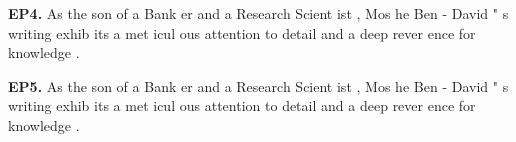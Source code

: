 \begin{mdframed}
\textbf{EP4.} \textcolor{Gray0}{As} \textcolor{Gray0}{the} \textcolor{Gray0}{son} \textcolor{Gray3}{of} \textcolor{Gray1}{a} \textcolor{Gray0}{Bank} \textcolor{Gray0}{er} \textcolor{Gray1}{and} \textcolor{Gray0}{a} \textcolor{Gray0}{Research} \textcolor{Gray1}{Scient} \textcolor{Gray5}{ist} \textcolor{Gray1}{,} \textcolor{Gray0}{Mos} \textcolor{Gray0}{he} \textcolor{Gray0}{Ben} \textcolor{Gray0}{-} \textcolor{Gray1}{David} \textcolor{Gray0}{"} \textcolor{Gray3}{s} \textcolor{Gray0}{writing} \textcolor{Gray0}{exhib} \textcolor{Gray4}{its} \textcolor{Gray1}{a} \textcolor{Gray0}{met} \textcolor{Gray7}{icul} \textcolor{Gray2}{ous} \textcolor{Gray0}{attention} \textcolor{Gray4}{to} \textcolor{Gray4}{detail} \textcolor{Gray0}{and} \textcolor{Gray1}{a} \textcolor{Gray0}{deep} \textcolor{Gray0}{rever} \textcolor{Gray1}{ence} \textcolor{Gray3}{for} \textcolor{Gray2}{knowledge} \textcolor{Gray0}{.} 

\textbf{EP5.} \textcolor{Gray0}{As} \textcolor{Gray0}{the} \textcolor{Gray0}{son} \textcolor{Gray3}{of} \textcolor{Gray1}{a} \textcolor{Gray0}{Bank} \textcolor{Gray0}{er} \textcolor{Gray0}{and} \textcolor{Gray0}{a} \textcolor{Gray0}{Research} \textcolor{Gray0}{Scient} \textcolor{Gray5}{ist} \textcolor{Gray1}{,} \textcolor{Gray0}{Mos} \textcolor{Gray0}{he} \textcolor{Gray0}{Ben} \textcolor{Gray0}{-} \textcolor{Gray0}{David} \textcolor{Gray0}{"} \textcolor{Gray3}{s} \textcolor{Gray0}{writing} \textcolor{Gray0}{exhib} \textcolor{Gray3}{its} \textcolor{Gray1}{a} \textcolor{Gray0}{met} \textcolor{Gray7}{icul} \textcolor{Gray1}{ous} \textcolor{Gray0}{attention} \textcolor{Gray4}{to} \textcolor{Gray3}{detail} \textcolor{Gray0}{and} \textcolor{Gray1}{a} \textcolor{Gray0}{deep} \textcolor{Gray0}{rever} \textcolor{Gray0}{ence} \textcolor{Gray3}{for} \textcolor{Gray1}{knowledge} \textcolor{Gray0}{.} 

\end{mdframed}